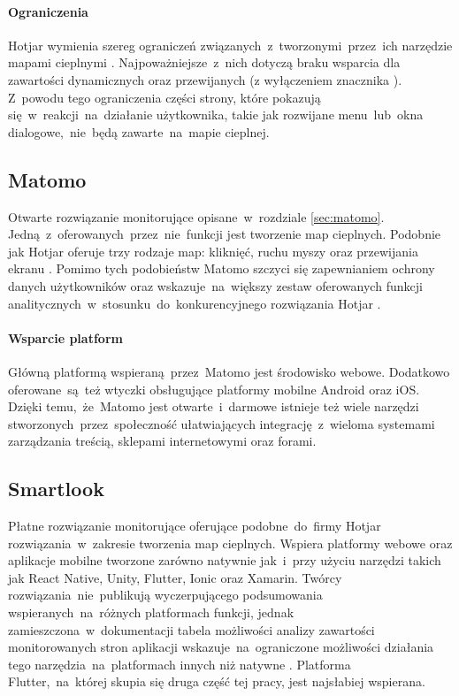 \paragraph{Ograniczenia} 
Hotjar wymienia szereg ograniczeń związanych~z~tworzonymi~przez~ich narzędzie mapami cieplnymi \cite{Hotjar_limitations}. Najpoważniejsze~z~nich dotyczą braku wsparcia dla zawartości dynamicznych oraz przewijanych (z wyłączeniem znacznika ). Z~powodu tego ograniczenia części strony, które pokazują się~w~reakcji~na~działanie użytkownika, takie jak rozwijane menu~lub~okna dialogowe,~nie~będą zawarte~na~mapie cieplnej.

\subsection{Matomo}
\label{sec:matomo_heatmap}
Otwarte rozwiązanie monitorujące opisane~w~rozdziale \ref{sec:matomo}. Jedną~z~oferowanych~przez~nie~funkcji jest tworzenie map cieplnych. Podobnie jak Hotjar oferuje trzy rodzaje map: kliknięć, ruchu myszy oraz przewijania ekranu \cite{Matomo_heatmaps}. Pomimo tych podobieństw Matomo szczyci się zapewnianiem ochrony danych użytkowników oraz wskazuje~na~większy zestaw oferowanych funkcji analitycznych~w~stosunku~do~konkurencyjnego rozwiązania Hotjar \cite{Matomo_hotjar}.

\paragraph{Wsparcie platform} 
Główną platformą wspieraną~przez~Matomo jest środowisko webowe. Dodatkowo oferowane~są~też wtyczki obsługujące platformy mobilne Android oraz iOS. Dzięki temu,~że~Matomo jest otwarte~i~darmowe istnieje też wiele narzędzi stworzonych~przez~społeczność ułatwiających integrację~z~wieloma systemami zarządzania treścią, sklepami internetowymi oraz forami.

\subsection{Smartlook}
\label{sec:smartlook}
Płatne rozwiązanie monitorujące oferujące podobne~do~firmy Hotjar rozwiązania~w~zakresie tworzenia map cieplnych. Wspiera platformy webowe oraz aplikacje mobilne tworzone zarówno natywnie jak~i~przy użyciu narzędzi takich jak React Native, Unity, Flutter, Ionic oraz Xamarin. Twórcy rozwiązania~nie~publikują wyczerpującego podsumowania wspieranych~na~różnych platformach funkcji, jednak zamieszczona~w~dokumentacji tabela możliwości analizy zawartości monitorowanych stron aplikacji wskazuje~na~ograniczone możliwości działania tego narzędzia~na~platformach innych niż natywne \cite{Smartlook_support}. Platforma Flutter,~na~której skupia się druga część tej pracy, jest najsłabiej wspierana.

